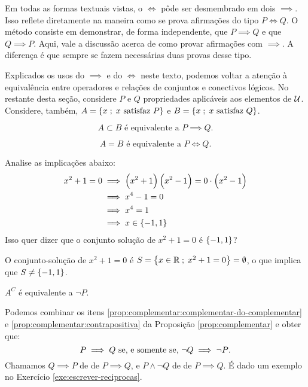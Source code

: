 Em todas as formas textuais vistas, o $\iff$ pôde ser desmembrado em dois $\implies$.
Isso reflete diretamente na maneira como se prova afirmações do tipo $P \iff Q$.
O método consiste em demonstrar, de forma independente, que $P \implies Q$ e que $Q \implies P$.
Aqui, vale a discussão acerca de como provar afirmações com $\implies$.
A diferença é que sempre se fazem necessárias duas provas desse tipo.

Explicados os usos do $\implies$  e do $\iff$ neste texto, podemos voltar a atenção à equivalência entre operadores e relações de conjuntos e conectivos lógicos.
No restante desta seção, considere $P$ e $Q$ propriedades aplicáveis aos elementos de $\mathcal{U}$.
Considere, também, $A = \set {x \;;\;x \text{ satisfaz } P}$ e $B= \set {x \;;\;x \text{ satisfaz } Q}$.

\begin{equivalence} 
$$ A \subset B \text{ é equivalente a } P \implies Q \text{.} $$
\end{equivalence}

\begin{equivalence} 
$$ A = B \text{ é equivalente a } P \iff Q \text{.} $$
\end{equivalence}

\begin{example}
Analise as implicações abaixo:
\begin{equation*}
\begin{aligned}
x^2+1=0 & \implies \left(x^2 +1 \right) \left( x^2-1 \right) = 0
\cdot \left( x^2-1 \right) \\
& \implies x^4 - 1 = 0 \\
& \implies x^4 = 1 \\
& \implies x \in \set {-1, 1}
\end{aligned}
\end{equation*}
%
Isso quer dizer que o conjunto solução de $x^2 +1 = 0$ é $\set{-1, 1}$?
\end{example}

\begin{solution}
O conjunto-solução de $x^2 + 1 = 0$ é $S = \set{x \in \mathbb{R}\;;\;x^2 + 1 = 0} = \emptyset$, o que implica que $S \ne \set{-1,1}$.
\end{solution}

\begin{equivalence} 
$A^C$ é equivalente a $\neg P$.
\end{equivalence}
Podemos combinar os itens \ref{prop:complementar:complementar-do-complementar} e \ref{prop:complementar:contrapositiva} da Proposição \ref{prop:complementar} e obter que:
%
$$ P \implies Q \text{ se, e somente se, } \neg Q \implies \neg P \text{.} $$
%
Chamamos $Q \implies P$ de  de $P \implies Q$, e $P \land \neg Q$ de \newline de $P \implies Q$. É dado um exemplo no Exercício \ref{exe:escrever-reciprocas}.

